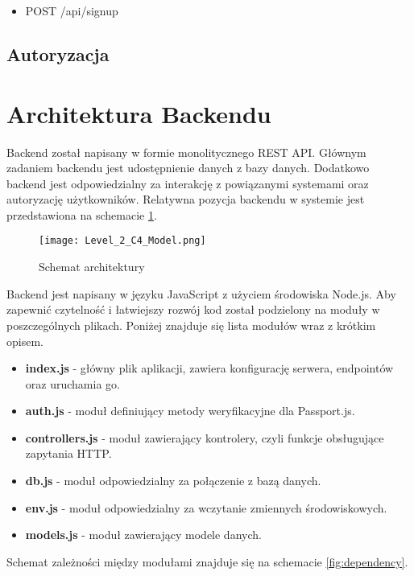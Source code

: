 \documentclass{documentation}
\begin{document}
\begin{itemize}
    \item POST /api/signup
\end{itemize}

\subsection{Autoryzacja}

\section{Architektura Backendu}

Backend został napisany w formie monolitycznego REST API.
Głównym zadaniem backendu jest udostępnienie danych z bazy danych.
Dodatkowo backend jest odpowiedzialny za interakcję z powiązanymi systemami oraz autoryzację użytkowników.
Relatywna pozycja backendu w systemie jest przedstawiona na schemacie \ref{fig:arch}.

\begin{figure}[h]
    \centering
    \texttt{[image: Level\_2\_C4\_Model.png]}
    \caption{Schemat architektury\label{fig:arch}}
\end{figure}

Backend jest napisany w języku JavaScript z użyciem środowiska Node.js.
Aby zapewnić czytelność i łatwiejszy rozwój kod został podzielony na moduły w poszczególnych plikach.
Poniżej znajduje się lista modułów wraz z krótkim opisem.

\begin{itemize}
    \item \textbf{index.js} - główny plik aplikacji, zawiera konfigurację serwera, endpointów oraz uruchamia go.
    \item \textbf{auth.js} - moduł definiujący metody weryfikacyjne dla Passport.js.
    \item \textbf{controllers.js} - moduł zawierający kontrolery, czyli funkcje obsługujące zapytania HTTP.
    \item \textbf{db.js} - moduł odpowiedzialny za połączenie z bazą danych.
    \item \textbf{env.js} - moduł odpowiedzialny za wczytanie zmiennych środowiskowych.
    \item \textbf{models.js} - moduł zawierający modele danych.
\end{itemize}

Schemat zależności między modułami znajduje się na schemacie \ref{fig:dependency}.
\end{document}
